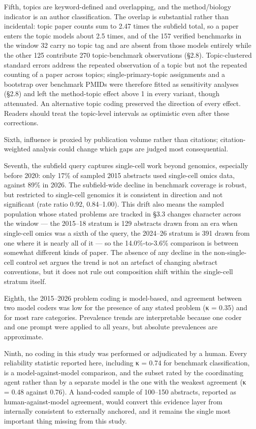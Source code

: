 \documentclass{article}
\begin{document}
Fifth, topics are keyword-defined and overlapping, and the
method/biology indicator is an author classification. The overlap is
substantial rather than incidental: topic paper counts sum to 2.47 times
the subfield total, so a paper enters the topic models about 2.5 times,
and of the 157 verified benchmarks in the window 32 carry no topic tag
and are absent from those models entirely while the other 125 contribute
270 topic-benchmark observations (§2.8). Topic-clustered standard errors
address the repeated observation of a topic but not the repeated
counting of a paper across topics; single-primary-topic assignments and
a bootstrap over benchmark PMIDs were therefore fitted as sensitivity
analyses (§2.8) and left the method-topic effect above 1 in every
variant, though attenuated. An alternative topic coding preserved the
direction of every effect. Readers should treat the topic-level
intervals as optimistic even after these corrections.

Sixth, influence is proxied by publication volume rather than citations;
citation-weighted analysis could change which gaps are judged most
consequential.

Seventh, the subfield query captures single-cell work beyond genomics,
especially before 2020: only 17\% of sampled 2015 abstracts used
single-cell omics data, against 89\% in 2026. The subfield-wide decline
in benchmark coverage is robust, but restricted to single-cell genomics
it is consistent in direction and not significant (rate ratio 0.92,
0.84--1.00). This drift also means the sampled population whose stated
problems are tracked in §3.3 changes character across the window --- the
2015--18 stratum is 129 abstracts drawn from an era when single-cell
omics was a sixth of the query, the 2024--26 stratum is 391 drawn from
one where it is nearly all of it --- so the 14.0\%-to-3.6\% comparison
is between somewhat different kinds of paper. The absence of any decline
in the non-single-cell control set argues the trend is not an artefact
of changing abstract conventions, but it does not rule out composition
shift within the single-cell stratum itself.

Eighth, the 2015--2026 problem coding is model-based, and agreement
between two model coders was low for the presence of any stated problem
(κ = 0.35) and for most rare categories. Prevalence trends are
interpretable because one coder and one prompt were applied to all
years, but absolute prevalences are approximate.

Ninth, no coding in this study was performed or adjudicated by a human.
Every reliability statistic reported here, including κ = 0.74 for
benchmark classification, is a model-against-model comparison, and the
subset rated by the coordinating agent rather than by a separate model
is the one with the weakest agreement (κ = 0.48 against 0.76). A
hand-coded sample of 100--150 abstracts, reported as human-against-model
agreement, would convert this evidence layer from internally consistent
to externally anchored, and it remains the single most important thing
missing from this study.
\end{document}
